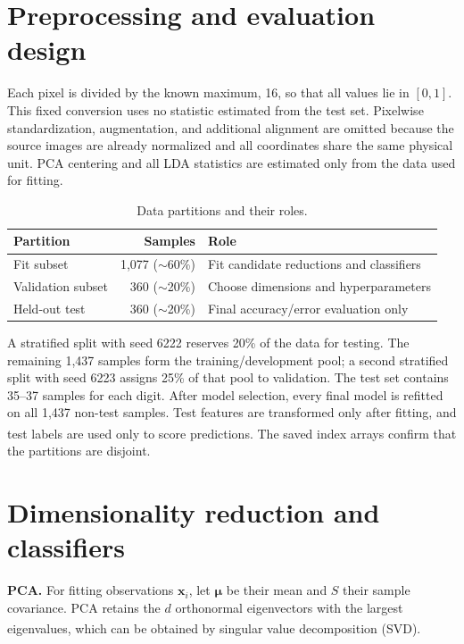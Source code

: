 \documentclass[11pt,a4paper]{article}
\newcommand{\supcite}[1]{\textsuperscript{\cite{#1}}}
\newcommand{\method}[1]{\textbf{#1}}
\begin{document}
\section{Preprocessing and evaluation design}

Each pixel is divided by the known maximum, 16, so that all values lie in $[0,1]$. This fixed conversion uses no statistic estimated from the test set. Pixelwise standardization, augmentation, and additional alignment are omitted because the source images are already normalized and all coordinates share the same physical unit. PCA centering and all LDA statistics are estimated only from the data used for fitting.

\begin{table}[htbp]
\centering
\small
\caption{Data partitions and their roles.}
\begin{tabularx}{\textwidth}{@{}l r Y@{}}
\toprule
Partition & Samples & Role \\
\midrule
Fit subset & 1,077 ($\sim$60\%) & Fit candidate reductions and classifiers \\
Validation subset & 360 ($\sim$20\%) & Choose dimensions and hyperparameters \\
Held-out test & 360 ($\sim$20\%) & Final accuracy/error evaluation only \\
\bottomrule
\end{tabularx}
\end{table}

A stratified split with seed 6222 reserves 20\% of the data for testing. The remaining 1,437 samples form the training/development pool; a second stratified split with seed 6223 assigns 25\% of that pool to validation. The test set contains 35--37 samples for each digit. After model selection, every final model is refitted on all 1,437 non-test samples. Test features are transformed only after fitting, and test labels are used only to score predictions.\supcite{pitfalls} The saved index arrays confirm that the partitions are disjoint.

\section{Dimensionality reduction and classifiers}

\method{PCA.} For fitting observations $\mathbf{x}_i$, let $\boldsymbol{\mu}$ be their mean and $S$ their sample covariance. PCA retains the $d$ orthonormal eigenvectors with the largest eigenvalues, which can be obtained by singular value decomposition (SVD).\supcite{pca}
\end{document}
